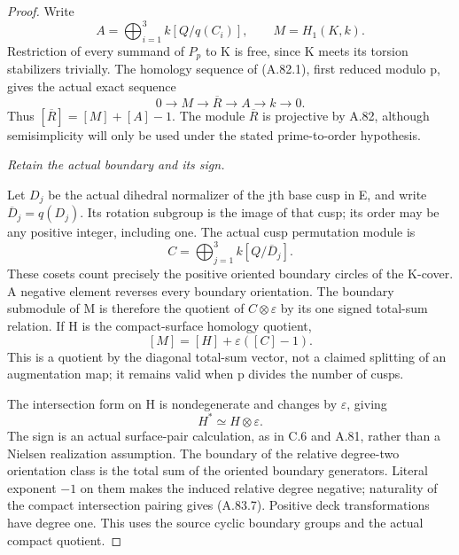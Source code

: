 \begin{proof}
Write
\[
 A=\bigoplus_{i=1}^3 k[Q/q(C_i)],\qquad M=H_1(K,k).
\]
Restriction of every summand of \(P_p\) to K is free,
since K meets its torsion stabilizers trivially. The
homology sequence of (A.82.1), first reduced modulo p,
gives the actual exact sequence
\[
                 0\longrightarrow M\longrightarrow\overline R
                    \longrightarrow A\longrightarrow k
                    \longrightarrow0.
 \tag{A.83.4}
\]
Thus \([\overline R]=[M]+[A]-1\). The module
\(\overline R\) is projective by A.82, although
semisimplicity will only be used under the stated
prime-to-order hypothesis.

\emph{Retain the actual boundary and its sign.}\par
Let \(D_j\) be the actual dihedral normalizer of the
jth base cusp in E, and write \(\overline D_j=q(D_j)\).
Its rotation subgroup is the image of that cusp; its order
may be any positive integer, including one. The actual
cusp permutation module is
\[
                         C=\bigoplus_{j=1}^3 k[Q/\overline D_j].
 \tag{A.83.5}
\]
These cosets count precisely the positive oriented
boundary circles of the K-cover. A negative element
reverses every boundary orientation. The boundary
submodule of M is therefore the quotient of
\(C\otimes\varepsilon\) by its one signed total-sum
relation. If H is the compact-surface homology quotient,
\[
                         [M]=[H]+\varepsilon([C]-1).
 \tag{A.83.6}
\]
This is a quotient by the diagonal total-sum vector,
not a claimed splitting of an augmentation map; it
remains valid when p divides the number of cusps.

The intersection form on H is nondegenerate and changes
by \(\varepsilon\), giving
\[
                                H^*\simeq H\otimes\varepsilon.
 \tag{A.83.7}
\]
The sign is an actual surface-pair calculation, as in C.6
and A.81, rather than a Nielsen realization assumption.
The boundary of the relative degree-two orientation class
is the total sum of the oriented boundary generators.
Literal exponent \(-1\) on them makes the induced
relative degree negative; naturality of the compact
intersection pairing gives (A.83.7). Positive deck
transformations have degree one. This uses the source
cyclic boundary groups and the actual compact quotient.


\end{proof}
